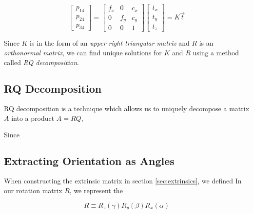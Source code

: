 \begin{equation}
    \begin{bmatrix}
        p_{14} \\ p_{24} \\ p_{34}
    \end{bmatrix}
    =
    \begin{bmatrix}
        f_x & 0   & c_x \\
        0   & f_y & c_y \\
        0   & 0   & 1
    \end{bmatrix}
    \begin{bmatrix}
        t_x \\ t_y \\ t_z
    \end{bmatrix}
    =K\vec{t}
\end{equation}

Since $K$ is in the form of an \emph{upper right triangular matrix} and $R$ is an \emph{orthonormal matrix}, we can find unique solutions for $K$ and $R$ using a method called \emph{RQ decomposition}.

\subsection{RQ Decomposition}

RQ decomposition is a technique which allows us to uniquely decompose a matrix $A$ into a product $A=RQ$,

Since

\subsection{Extracting Orientation as Angles}

When constructing the extrinsic matrix in section \ref{sec:extrinsics}, we defined
In our rotation matrix $R$, we represent the


\begin{equation}
    R \equiv R_z(\gamma)R_y(\beta)R_x(\alpha)
\end{equation}


